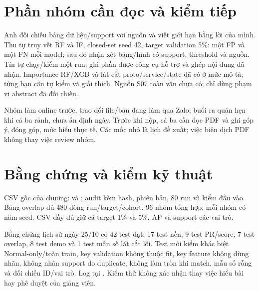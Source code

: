 



\section{Phần nhóm cần đọc và kiểm tiếp}
Anh đối chiếu bảng dữ liệu/support với nguồn và viết giới hạn bằng lời của mình. Thu tự truy vết RF và IF, closed-set seed 42, target validation 5\%: một FP và một FN mỗi model; sau đó nhận xét bảng/hình có support, threshold và nguồn. Tín tự chạy/kiểm một run, ghi phần được công cụ hỗ trợ và ghép nội dung đã nhận. Importance RF/XGB và lát cắt proto/service/state đã có ở mức mô tả; từng bạn cần tự kiểm và giải thích. Nguồn S07 toàn văn chưa có; chỉ dùng phạm vi abstract đã đối chiếu.

Nhóm làm online trước, trao đổi file/bản đang làm qua Zalo; buổi ra quán hẹn khi cả ba rảnh, chưa ấn định ngày. Trước khi nộp, cả ba cần đọc PDF và ghi góp ý, đóng góp, mức hiểu thực tế. Các mốc nhỏ là lịch đề xuất; việc biên dịch PDF không thay việc review nhóm.

\section{Bằng chứng và kiểm kỹ thuật}
CSV gốc của chương:  và ; audit kèm hash, phiên bản, 80 run và kiểm đầu vào. Bảng overlap đủ 480 dòng run/target/cohort, 96 nhóm tổng hợp; mỗi nhóm có năm seed. CSV đầy đủ giữ cả target 1\% và 5\%, AP và support các vai trò.

Bằng chứng lịch sử ngày 25/10 có 42 test đạt: 17 test nền, 9 test PR/score, 7 test overlap, 8 test demo và 1 test mẫu số lát cắt lỗi. Test mới kiểm khác biệt Normal-only/toàn train, key validation không thuộc fit, key feature không dùng nhãn, không nhân support do duplicate, không làm tròn khi match, mẫu số rỗng và đối chiếu ID/vai trò. Log tại . Kiểm thử không xác nhận thay việc hiểu bài hay phê duyệt của giảng viên.
